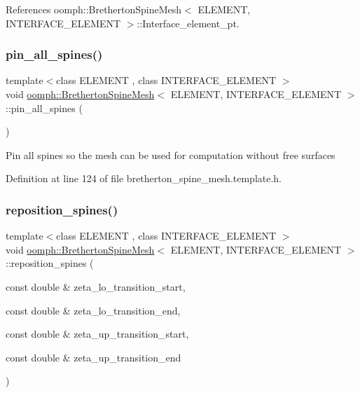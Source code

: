 References oomph\+::\+Bretherton\+Spine\+Mesh$<$ E\+L\+E\+M\+E\+N\+T, I\+N\+T\+E\+R\+F\+A\+C\+E\+\_\+\+E\+L\+E\+M\+E\+N\+T $>$\+::\+Interface\+\_\+element\+\_\+pt.

\mbox{\label{classoomph_1_1BrethertonSpineMesh_a507ea97977b837f2f0d9647407d770cd}} 
\subsubsection{\texorpdfstring{pin\+\_\+all\+\_\+spines()}{pin\_all\_spines()}}
{\footnotesize\ttfamily template$<$class E\+L\+E\+M\+E\+NT , class I\+N\+T\+E\+R\+F\+A\+C\+E\+\_\+\+E\+L\+E\+M\+E\+NT $>$ \\
void \hyperlink{classoomph_1_1BrethertonSpineMesh}{oomph\+::\+Bretherton\+Spine\+Mesh}$<$ E\+L\+E\+M\+E\+NT, I\+N\+T\+E\+R\+F\+A\+C\+E\+\_\+\+E\+L\+E\+M\+E\+NT $>$\+::pin\+\_\+all\+\_\+spines (\begin{DoxyParamCaption}{ }\end{DoxyParamCaption})\hspace{0.3cm}{\ttfamily [inline]}}

Pin all spines so the mesh can be used for computation without free surfaces 

Definition at line 124 of file bretherton\+\_\+spine\+\_\+mesh.\+template.\+h.

\mbox{\label{classoomph_1_1BrethertonSpineMesh_a0dfeac5bc9a4fa4bfdcd443def30dcdb}} 
\subsubsection{\texorpdfstring{reposition\+\_\+spines()}{reposition\_spines()}}
{\footnotesize\ttfamily template$<$class E\+L\+E\+M\+E\+NT , class I\+N\+T\+E\+R\+F\+A\+C\+E\+\_\+\+E\+L\+E\+M\+E\+NT $>$ \\
void \hyperlink{classoomph_1_1BrethertonSpineMesh}{oomph\+::\+Bretherton\+Spine\+Mesh}$<$ E\+L\+E\+M\+E\+NT, I\+N\+T\+E\+R\+F\+A\+C\+E\+\_\+\+E\+L\+E\+M\+E\+NT $>$\+::reposition\+\_\+spines (\begin{DoxyParamCaption}\item[{const double \&}]{zeta\+\_\+lo\+\_\+transition\+\_\+start,  }\item[{const double \&}]{zeta\+\_\+lo\+\_\+transition\+\_\+end,  }\item[{const double \&}]{zeta\+\_\+up\+\_\+transition\+\_\+start,  }\item[{const double \&}]{zeta\+\_\+up\+\_\+transition\+\_\+end }\end{DoxyParamCaption})}



